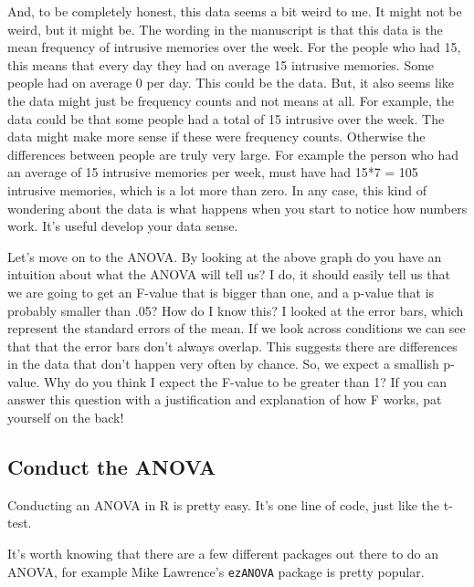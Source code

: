 \documentclass[
]{book}
\begin{document}
And, to be completely honest, this data seems a bit weird to me. It might not be weird, but it might be. The wording in the manuscript is that this data is the mean frequency of intrusive memories over the week. For the people who had 15, this means that every day they had on average 15 intrusive memories. Some people had on average 0 per day. This could be the data. But, it also seems like the data might just be frequency counts and not means at all. For example, the data could be that some people had a total of 15 intrusive over the week. The data might make more sense if these were frequency counts. Otherwise the differences between people are truly very large. For example the person who had an average of 15 intrusive memories per week, must have had 15*7 = 105 intrusive memories, which is a lot more than zero. In any case, this kind of wondering about the data is what happens when you start to notice how numbers work. It's useful develop your data sense.

Let's move on to the ANOVA. By looking at the above graph do you have an intuition about what the ANOVA will tell us? I do, it should easily tell us that we are going to get an F-value that is bigger than one, and a p-value that is probably smaller than .05? How do I know this? I looked at the error bars, which represent the standard errors of the mean. If we look across conditions we can see that that the error bars don't always overlap. This suggests there are differences in the data that don't happen very often by chance. So, we expect a smallish p-value. Why do you think I expect the F-value to be greater than 1? If you can answer this question with a justification and explanation of how F works, pat yourself on the back!

\hypertarget{conduct-the-anova}{%
\subsection{Conduct the ANOVA}\label{conduct-the-anova}}

Conducting an ANOVA in R is pretty easy. It's one line of code, just like the t-test.

It's worth knowing that there are a few different packages out there to do an ANOVA, for example Mike Lawrence's \texttt{ezANOVA} package is pretty popular.
\end{document}
